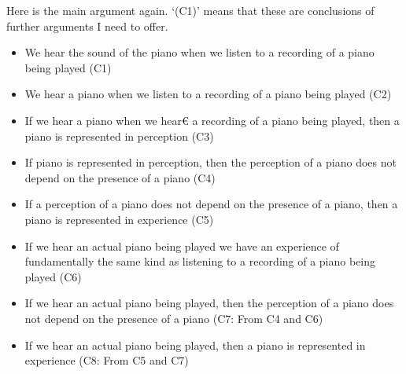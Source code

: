 \documentclass[sloppy, journal, git, bytitle, dodraft]{humapap}
\begin{document}

Here is the main argument again. `(C1)' means that these are conclusions of further arguments I need to offer.

\begin{itemize}
	\item We hear the sound of the piano when we listen to a recording of a piano being played (C1)
	\item We hear a piano when we listen to a recording of a piano being played (C2)
	\item If we hear a piano when we hear€ a recording of a piano being played, then a piano is represented in perception (C3)
	\item If piano is represented in perception, then the perception of a piano does not depend on the presence of a piano (C4) 
	\item If a perception of a piano does not depend on the presence of a piano, then a piano is represented in experience (C5)
	\item If we hear an actual piano being played we have an experience of fundamentally the same kind as listening to a recording of a piano being played (C6)
	\item If we hear an actual piano being played, then the perception of a piano does not depend on the presence of a piano (C7: From C4 and C6)
	\item If we hear an actual piano being played, then a piano is represented in experience (C8: From C5 and C7)
\end{itemize}




\printbibliography
\end{document}
